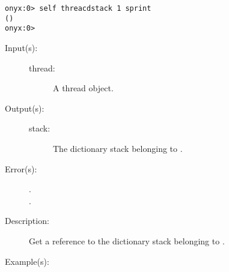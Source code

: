 \begin{description}
\begin{description}
\begin{verbatim}
onyx:0> self threacdstack 1 sprint
()
onyx:0>
		\end{verbatim}
	\end{description}
\label{systemdict:threaddstack}
\item[{\onyxop{thread}{threaddstack}{stack}}: ]
	\begin{description}\item[]
	\item[Input(s): ]
		\begin{description}\item[]
		\item[thread: ]
			A thread object.
		\end{description}
	\item[Output(s): ]
		\begin{description}\item[]
		\item[stack: ]
			The dictionary stack belonging to .
		\end{description}
	\item[Error(s): ]
		\begin{description}\item[]
		\item[.]
		\item[.]
		\end{description}
	\item[Description: ]
		Get a reference to the dictionary stack belonging to
		.
	\item[Example(s): ]\begin{verbatim}


\end{verbatim}
\end{description}
\end{description}
